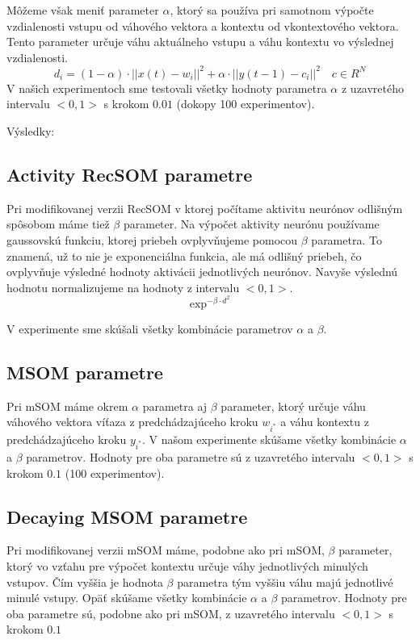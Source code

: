 Môžeme však meniť parameter $\alpha$, ktorý sa používa pri samotnom výpočte vzdialenosti
vstupu od váhového vektora a kontextu od vkontextového vektora. Tento parameter určuje váhu aktuálneho vstupu a váhu kontextu
vo výslednej vzdialenosti.
\begin{equation}
	d_i = (1 - \alpha) \cdot ||x(t) - w_i||^{2} + \alpha \cdot ||y(t-1) - c_i||^{2} \quad c \in R^{N}
\end{equation}
V našich experimentoch sme testovali všetky hodnoty parametra $\alpha$ z uzavretého intervalu
$<0, 1>$ s krokom $0.01$ (dokopy 100 experimentov).


Výsledky: \\

\subsection{Activity RecSOM parametre}
Pri modifikovanej verzii RecSOM v ktorej počítame aktivitu neurónov
odlišným spôsobom máme tiež $\beta$ parameter. 
Na výpočet aktivity neurónu používame gaussovskú funkciu, ktorej priebeh ovplyvňujeme
pomocou $\beta$ parametra. To znamená, už to nie je exponenciálna funkcia, ale má odlišný priebeh, 
čo ovplyvňuje výsledné hodnoty aktivácii jednotlivých neurónov. Navyše výslednú hodnotu normalizujeme na
hodnoty z intervalu $<0, 1>$.
\begin{equation}
    \exp^{-\beta \cdot d^2}
\end{equation}

V experimente sme skúšali všetky kombinácie parametrov $\alpha$ a $\beta$.


\subsection{MSOM parametre}
Pri mSOM máme okrem $\alpha$ parametra aj $\beta$ parameter, ktorý určuje váhu
váhového vektora víťaza z predchádzajúceho kroku $w_{i^{*}}$ a váhu kontextu
z predchádzajúceho kroku $y_{i^{*}}$.
V našom experimente skúšame všetky kombinácie $\alpha$ a $\beta$ parametrov.
Hodnoty pre oba parametre sú z uzavretého intervalu $<0, 1>$ s krokom $0.1$ (100 experimentov).


\subsection{Decaying MSOM parametre}
Pri modifikovanej verzii mSOM máme, podobne ako pri mSOM, $\beta$ parameter, ktorý vo vzťahu 
pre výpočet kontextu určuje váhy jednotlivých minulých vstupov. Čím vyššia je hodnota $\beta$
parametra tým vyššiu váhu majú jednotlivé minulé vstupy.
Opäť skúšame všetky kombinácie $\alpha$ a $\beta$ parametrov.
Hodnoty pre oba parametre sú, podobne ako pri mSOM, z uzavretého intervalu $<0, 1>$ s krokom $0.1$

